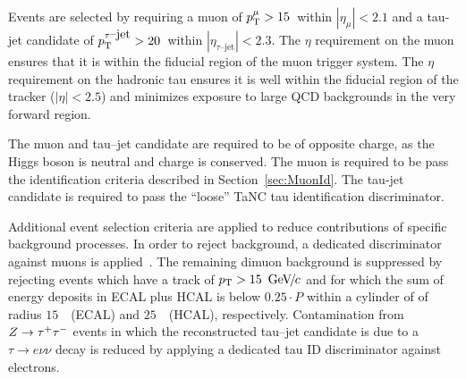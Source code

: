 Events are selected by requiring a muon of $p_{\mathrm{T}}^{\mu} > 15$~\GeVc within $
\left| \eta_{\mu} \right| < 2.1$ and a tau-jet candidate of
$p_{\mathrm{T}}^{\tau\mbox{--jet}} > 20$~\GeVc within $|\eta_{\tau\mbox{--jet}}| < 2.3$.
The $\eta$ requirement on the muon ensures that it is within the fiducial region
of the muon trigger system.  The $\eta$ requirement on the hadronic tau ensures
it is well within the fiducial region of the tracker ($|\eta| < 2.5$) and
minimizes exposure to large QCD backgrounds in the very forward region.

The muon and tau--jet candidate are required to be of opposite charge, as the
Higgs boson is neutral and charge is conserved.  The muon is required to be pass the
identification criteria described in Section~\ref{sec:MuonId}.   The tau-jet
candidate is required to pass the ``loose'' TaNC tau identification
discriminator. 

Additional event selection criteria are applied to reduce contributions of
specific background processes. In order to reject \ZMM background, a dedicated
discriminator against muons is applied~\cite{CMS-PAS-PFT-08-001}. The remaining
dimuon background is suppressed by rejecting events which have a track of $p_{\mathrm{T}}
> 15~{\,\text{Ge\hspace{-.08em}V\hspace{-0.16em}/\hspace{-0.08em}}c}$ and for which the sum of energy deposits in ECAL plus HCAL is below
$0.25 \cdot P$ within a cylinder of of radius $15$~\centi\meter~(ECAL) and
$25$~\centi\meter~(HCAL), respectively.  Contamination from $Z \to \tau^+\tau^-$ events
in which the reconstructed tau--jet candidate is due to a $\tau \to e \nu \nu$
decay is reduced by applying a dedicated tau ID discriminator against electrons.

